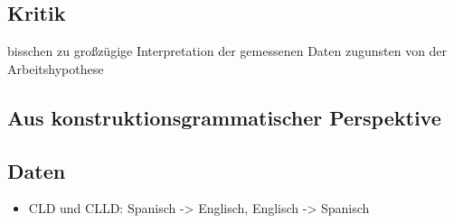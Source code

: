 
\subsection{Kritik}
bisschen zu großzügige Interpretation der gemessenen Daten zugunsten von der Arbeitshypothese

\subsection{Aus konstruktionsgrammatischer Perspektive}

\subsection{Daten}
\begin{itemize}
    \item \cite{Valenzuela05} CLD und CLLD: Spanisch -> Englisch, Englisch -> Spanisch
%
%
\end{itemize}
